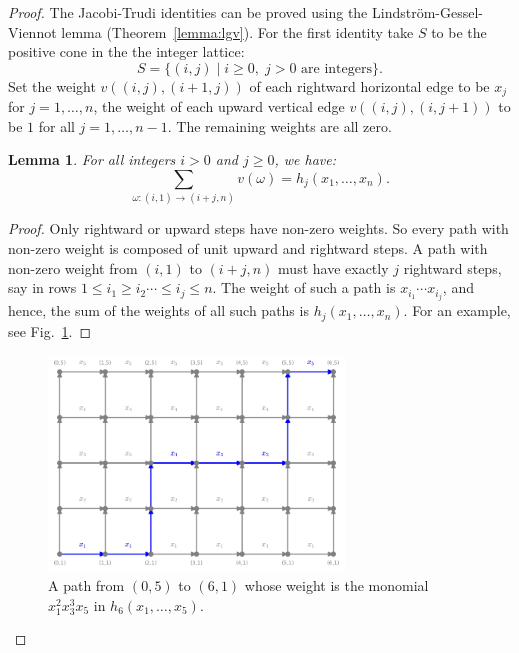 \documentclass[11pt]{amsart}
\newtheorem{lemma}[theorem]{Lemma}
\theoremstyle{definition}
\theoremstyle{example}
\begin{document}
\begin{proof}
  The Jacobi-Trudi identities can be proved using the Lindstr\"om-Gessel-Viennot lemma (Theorem~\ref{lemma:lgv}).
  For the first identity take $S$ to be the positive cone in the the integer lattice:
  \begin{displaymath}
    S = \{(i,j)\mid i\geq 0,\; j>0 \text{ are integers}\}.
  \end{displaymath}
  Set the weight $v((i,j), (i+1,j))$ of each rightward horizontal edge to be $x_j$ for $j=1,\dotsc, n$, the weight of each upward vertical edge $v((i,j), (i,j+1))$ to be $1$ for all $j=1,\dotsc,n-1$.
  The remaining weights are all zero.
  \begin{lemma}
    \label{lemma:entry}
    For all integers $i>0$ and $j\geq 0$, we have:
    \begin{displaymath}
      \sum_{\omega:(i, 1)\to (i+j, n)} v(\omega) = h_j(x_1,\dotsc,x_n).
    \end{displaymath}
  \end{lemma}
  \begin{proof}
    Only rightward or upward steps have non-zero weights.
    So every path with non-zero weight is composed of unit upward and rightward steps.
    A path with non-zero weight from $(i, 1)$ to $(i+j, n)$ must have exactly $j$ rightward steps, say in rows $1\leq i_1\geq i_2 \dotsb \leq i_j\leq n$.
    The weight of such a path is $x_{i_1}\dotsb x_{i_j}$, and hence, the sum of the weights of all such paths is $h_j(x_1,\dotsc, x_n)$. For an example, see Fig.~\ref{fig:path_example}.
  \end{proof}
  \begin{figure}
    \centering
    \includegraphics[width=0.7\textwidth]{path_example.png}
    \caption{A path from $(0, 5)$ to $(6, 1)$ whose weight is the monomial $x_1^2x_3^3x_5$ in $h_6(x_1,\dotsc,x_5)$.}
    \label{fig:path_example}
  \end{figure}

\end{proof}
\end{document}
